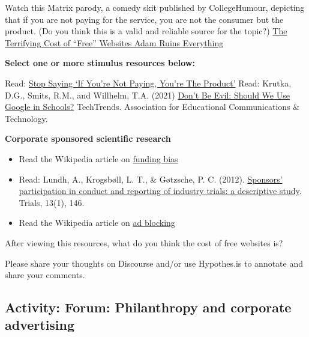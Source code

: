 \documentclass[
]{book}
\providecommand{\tightlist}{%
  \setlength{\itemsep}{0pt}\setlength{\parskip}{0pt}}
\theoremstyle{definition}
\theoremstyle{definition}
\theoremstyle{definition}
\theoremstyle{definition}
\theoremstyle{remark}
\begin{document}
\begin{reflect}
Watch this Matrix parody, a comedy skit published by CollegeHumour, depicting that if you are not paying for the service, you are not the consumer but the product. (Do you think this is a valid and reliable source for the topic?) \href{https://www.youtube.com/watch?v=5pFX2P7JLwA}{The Terrifying Cost of ``Free'' Websites \textbar{} Adam Ruins Everything}

\textbf{Select one or more stimulus resources below:}

Read: \href{https://www.techdirt.com/2012/12/20/stop-saying-if-youre-not-paying-youre-product/}{Stop Saying `If You're Not Paying, You're The Product'}
Read: Krutka, D.G., Smits, R.M., and Willhelm, T.A. (2021) \href{https://link.springer.com/article/10.1007/s11528-021-00599-4}{Don't Be Evil: Should We Use Google in Schools?} TechTrends. Association for Educational Communications \& Technology.

\textbf{Corporate sponsored scientific research}

\begin{itemize}
\tightlist
\item
  Read the Wikipedia article on \href{https://en.wikipedia.org/wiki/Funding_bias}{funding bias}\\
\item
  Read: Lundh, A., Krogsbøll, L. T., \& Gøtzsche, P. C. (2012). \href{https://trialsjournal.biomedcentral.com/articles/10.1186/1745-6215-13-146}{Sponsors' participation in conduct and reporting of industry trials: a descriptive study}. Trials, 13(1), 146.\\
\item
  Read the Wikipedia article on \href{https://en.wikipedia.org/wiki/Ad_blocking}{ad blocking}
\end{itemize}

After viewing this resources, what do you think the cost of free websites is?

Please share your thoughts on Discourse and/or use Hypothes.is to annotate and share your comments.
\end{reflect}

\hypertarget{activity-forum-philanthropy-and-corporate-advertising}{%
\subsection*{Activity: Forum: Philanthropy and corporate advertising}\label{activity-forum-philanthropy-and-corporate-advertising}}
\end{document}
